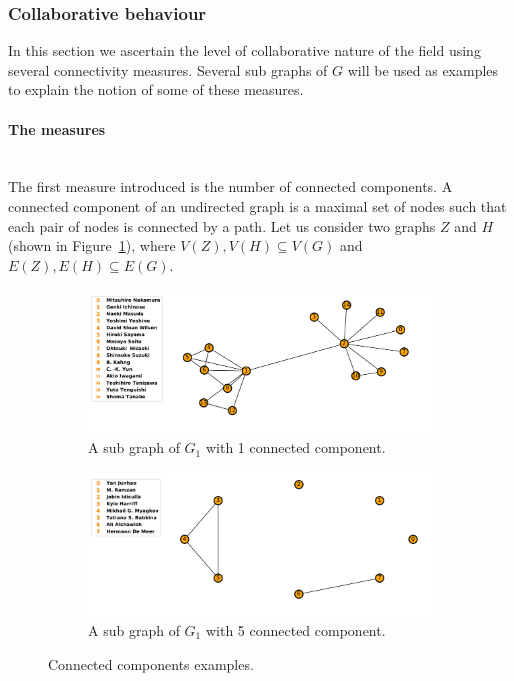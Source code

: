 \documentclass{article}
\begin{document}
\subsubsection{Collaborative behaviour}

In this section we ascertain the level of collaborative nature of the field
using several connectivity measures. Several sub graphs of \(G\) will be used
as examples to explain the notion of some of these measures.

\paragraph{The measures}
\mbox{ }\\

The first measure introduced is the number of connected components.
A connected component of an undirected graph is a maximal set of nodes such that
each pair of nodes is connected by a path. Let us consider two graphs \(Z\) and
\(H\) (shown in Figure~\ref{fig:connected_components}), where \(V(Z), V(H)
\subseteq V (G)\) and \( E(Z), E(H) \subseteq E(G)\).

\begin{center}
\begin{figure}[!hbtp]
    \begin{subfigure}{0.5\textwidth}
        \includegraphics[width=\textwidth]{./assets/images/connected_example_one.pdf}
        \caption{A sub graph of \(G_1\) with 1 connected component.}
    \end{subfigure}
    \begin{subfigure}{0.5\textwidth}
        \includegraphics[width=\textwidth]{./assets/images/connected_example_two.pdf}
        \caption{A sub graph of \(G_1\) with 5 connected component.}
    \end{subfigure}
\caption{Connected components examples.}
\label{fig:connected_components}
\end{figure}
\end{center}
\end{document}
